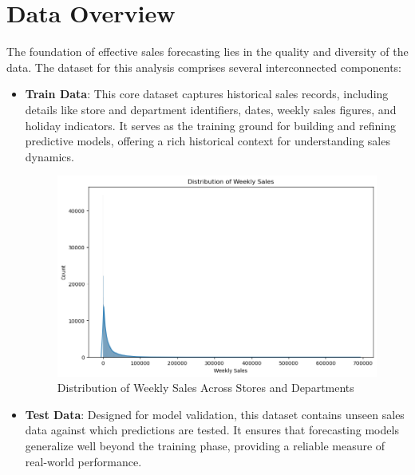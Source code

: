 \section{Data Overview}
The foundation of effective sales forecasting lies in the quality and diversity of the data. The dataset for this analysis comprises several interconnected components:
\begin{itemize}
    \item \textbf{Train Data}: This core dataset captures historical sales records, including details like store and department identifiers, dates, weekly sales figures, and holiday indicators. It serves as the training ground for building and refining predictive models, offering a rich historical context for understanding sales dynamics.
    \begin{figure}[h]
        \centering
        \includegraphics[width=0.8\linewidth]{./figures_adarsh/Distribution_Sales .png}
        \caption{Distribution of Weekly Sales Across Stores and Departments}
        \label{fig:weekly_sales_dist}
    \end{figure}
    
    \item \textbf{Test Data}: Designed for model validation, this dataset contains unseen sales data against which predictions are tested. It ensures that forecasting models generalize well beyond the training phase, providing a reliable measure of real-world performance.
    

\end{itemize}
